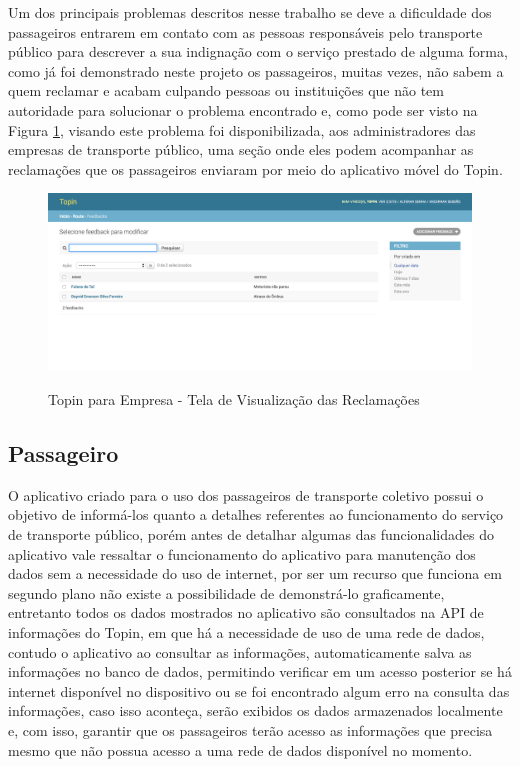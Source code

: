 {{{{{{{Um dos principais problemas descritos nesse trabalho se deve a dificuldade dos passageiros entrarem em contato com as pessoas
responsáveis pelo transporte público para descrever a sua indignação com o serviço prestado de alguma forma, como já foi
demonstrado neste projeto os passageiros, muitas vezes, não sabem a quem reclamar e acabam culpando pessoas ou instituições
que não tem autoridade para solucionar o problema encontrado e, como pode ser visto na Figura \ref{fig:empresa-visualizar-reclamacao},
visando este problema foi disponibilizada, aos administradores das empresas de transporte público, uma seção onde eles podem
acompanhar as reclamações que os passageiros enviaram por meio do aplicativo móvel do Topin.

\begin{figure}[H]
\caption{Topin para Empresa - Tela de Visualização das Reclamações}
\centering
\includegraphics[width=1.0\textwidth]{imagens/visualizar-reclamacao.png}
\label{fig:empresa-visualizar-reclamacao}
\end{figure}

\subsection{Passageiro}

O aplicativo criado para o uso dos passageiros de transporte coletivo possui o objetivo de informá-los quanto a detalhes referentes ao funcionamento do serviço de transporte público, porém antes de detalhar algumas das funcionalidades do aplicativo vale ressaltar o funcionamento do aplicativo para manutenção dos dados sem a necessidade do uso de internet, por ser um recurso que funciona em segundo plano não existe a possibilidade de demonstrá-lo graficamente, entretanto todos os dados mostrados no aplicativo são consultados na API de informações do Topin, em que há a necessidade de uso de uma rede de dados, contudo o aplicativo ao consultar as informações, automaticamente salva as informações no banco de dados, permitindo verificar em um acesso posterior se há  internet disponível no dispositivo ou se foi encontrado algum erro na consulta das informações, caso isso aconteça, serão exibidos os dados armazenados localmente e, com isso, garantir que os passageiros terão acesso as informações que precisa mesmo que não possua acesso a uma rede de dados disponível no momento.

}}}}}}}
